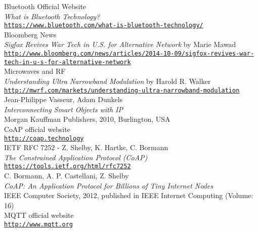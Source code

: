 \begin{thebibliography}{}
 Bluetooth Official Website\\
  \emph{What is Bluetooth Technology?} \\
  \footnotesize \texttt{\url{https://www.bluetooth.com/what-is-bluetooth-technology/}} \\
  
 Bloomberg News \\
  \emph{Sigfox Revives War Tech in U.S. for Alternative Network} by Marie Mawad \\
  \footnotesize \texttt{\url{http://www.bloomberg.com/news/articles/2014-10-09/sigfox-revives-war-tech-in-u-s-for-alternative-network}} \\
  
 Microwaves and RF\\
  \emph{Understanding Ultra Narrowband Modulation} by Harold R. Walker \\
  \footnotesize \texttt{\url{http://mwrf.com/markets/understanding-ultra-narrowband-modulation}} \\
  
 Jean-Philippe Vasseur, Adam Dunkels\\
  \emph{Interconnecting Smart Objects with IP} \\
  \footnotesize Morgan Kauffman Publishers, 2010, Burlington, USA \\
  
 CoAP official website\\
  \footnotesize \texttt{\url{http://coap.technology}} \\
  
 IETF RFC 7252 - Z. Shelby, K. Hartke, C. Bormann\\
  \emph{The Constrained Application Protocol (CoAP)} \\
  \footnotesize \texttt{\url{https://tools.ietf.org/html/rfc7252}} \\
  
 C. Bormann, A. P. Castellani, Z. Shelby\\
  \emph{CoAP: An Application Protocol for Billions of Tiny Internet Nodes} \\
  \footnotesize IEEE Computer Society, 2012, published in IEEE Internet Computing (Volume: 16) \\
  
 MQTT official website\\
  \footnotesize \texttt{\url{http://www.mqtt.org}} \\
  
\end{thebibliography}
